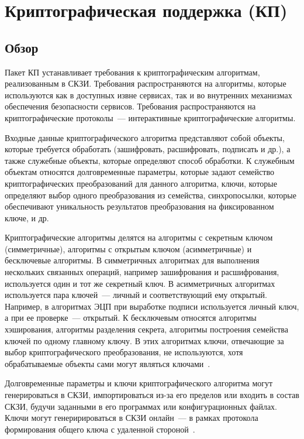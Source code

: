 \section{Криптографическая поддержка (КП)}\label{CS}

\subsection{Обзор}\label{CS.Intro}

Пакет КП устанавливает требования к криптографическим алгоритмам, реализованным
в СКЗИ.
%
Требования распространяются на алгоритмы, которые используются как в доступных
извне сервисах, так и во внутренних механизмах обеспечения безопасности
сервисов.
%
Требования распространяются на криптографические протоколы~---
интерактивные криптографические алгоритмы.

Входные данные криптографического алгоритма представляют собой объекты, которые
требуется обработать (зашифровать, расшифровать, подписать и др.), а также
служебные объекты, которые определяют способ обработки.
%
К служебным объектам относятся долговременные параметры, которые задают
семейство криптографических преобразований для данного алгоритма, ключи, которые
определяют выбор одного преобразования из семейства, синхропосылки, которые
обеспечивают уникальность результатов преобразования на фиксированном ключе, 
и др.

Криптографические алгоритмы делятся на алгоритмы с секретным ключом
(симметричные), алгоритмы с открытым ключом (асимметричные) и бесключевые
алгоритмы.
%
В симметричных алгоритмах для выполнения нескольких связанных операций, например
зашифрования и расшифрования, используется один и тот же секретный ключ.
%
В асимметричных алгоритмах используется пара ключей~--- личный и соответствующий
ему открытый. Например, в алгоритмах ЭЦП при выработке подписи используется
личный ключ, а при ее проверке~--- открытый.
%
К бесключевым относятся алгоритмы хэширования, алгоритмы разделения секрета,
алгоритмы построения семейства ключей по одному главному ключу. В этих
алгоритмах ключи, отвечающие за выбор криптографического преобразования, не
используются, хотя обрабатываемые объекты сами могут являться 
ключами~.

Долговременные параметры и ключи криптографического алгоритма
могут генерироваться в СКЗИ, импортироваться из-за его 
пределов или входить в состав СКЗИ, будучи заданными в его программах или 
конфигурационных файлах.
%
Ключи могут генеририроваться в СКЗИ онлайн~--- в рамках протокола 
формирования общего ключа с удаленной стороной~.

